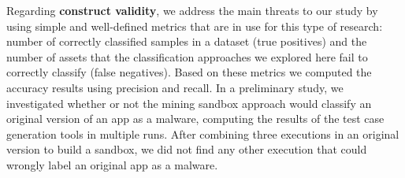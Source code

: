 \begin{comment}
    
Regarding the \textbf{correlation between dataset properties and accuracy drop}, after running statistical tests (logistic regression),
we could not find evidence that the \emph{diversity} of the
complete dataset---in terms of similarity score and types of malware-
is responsible for the higher number of false negatives of the mining
sandbox approach. This implies that there was no 1-1 correlation between the brackets of similarity index, malware types to the drops in accuracy. Therefore, further research is necessary to investigate
other possible reasons for that. Perhaps, the complete dataset
contains a large percentage of malware that use more
advanced techniques to evade from both static and dynamic analysis---
both methods are used in the mining sandbox approach
we discussed in this paper.


\end{comment}


Regarding {\bf construct validity}, we address the main threats
to our study by using simple and well-defined metrics that are
in use for this type of research: number of correctly classified
samples in a dataset (true positives) and the number of assets that the
classification approaches we explored here fail to
correctly classify (false negatives). Based on these metrics we computed
the accuracy results using precision and recall. In a preliminary study, we
investigated whether or not the mining sandbox approach
would classify an original version of an app as a malware,
computing the results of the test case generation tools in multiple
runs. After combining three executions in an original version to
build a sandbox, we did not find any other execution that
could wrongly label an original app as a malware. 
